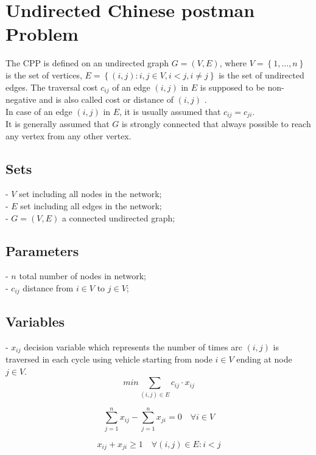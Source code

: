 \documentclass[a4paper,12pt,titlepage]{article}
\begin{document}
	\section*{Undirected Chinese postman Problem}
	
	The CPP is defined on an undirected graph $G=(V,E)$, where $V=\left\lbrace 1,…, n\right\rbrace $ is the set of vertices, $E =\left\lbrace (i,j)
	: i, j\in V, i<j, i\neq j\right\rbrace $ is the set of undirected edges. The traversal cost $c_{ij}$ of an edge $(i,j)$ in $E$ is supposed to be non-negative and is also called cost or distance of $(i,j)$ .\\ 
	In case of an edge $(i,j)$ in $E$, it is usually assumed that $c_{ij} = c_ {ji}$. \\
	It is generally assumed that $G$ is strongly connected that always possible to reach any vertex from any other vertex.
	\subsection*{Sets}
	- $V$ set including all nodes in the network;\\
	- $E$ set including all edges in the network;\\
	- $G=(V,E)$ a connected undirected graph;
	\subsection*{Parameters}
	- $n$ total number of nodes in network;\\
	- $c_{ij}$ distance from $i \in V$ to $j \in V$;
	\subsection*{Variables}
	- $x_{ij}$ decision variable which represents the number of times arc $(i,j)$ is traversed in each cycle using vehicle starting from node $i\in V$ ending at node $j\in V$.
	\begin{equation}
	min \sum_{(i,j)\in E}c_{ij} \cdot x_{ij}
	\end{equation}
	
	\begin{equation}
	\sum_{j=1}^{n} x_{ij} - \sum_{j=1}^{n} x_{ji} = 0 \quad \forall i\in V
	\end{equation}
	
	\begin{equation}
	x_{ij} + x_{ji} \geq 1 \quad \forall (i,j)\in E: i < j
	\end{equation}
	
\end{document}
